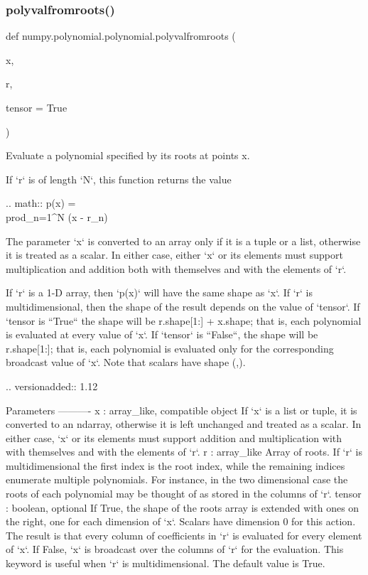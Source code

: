 \subsubsection{\texorpdfstring{polyvalfromroots()}{polyvalfromroots()}}
{\footnotesize\ttfamily def numpy.\+polynomial.\+polynomial.\+polyvalfromroots (\begin{DoxyParamCaption}\item[{}]{x,  }\item[{}]{r,  }\item[{}]{tensor = {\ttfamily True} }\end{DoxyParamCaption})}

\begin{DoxyVerb}Evaluate a polynomial specified by its roots at points x.

If `r` is of length `N`, this function returns the value

.. math:: p(x) = \\prod_{n=1}^{N} (x - r_n)

The parameter `x` is converted to an array only if it is a tuple or a
list, otherwise it is treated as a scalar. In either case, either `x`
or its elements must support multiplication and addition both with
themselves and with the elements of `r`.

If `r` is a 1-D array, then `p(x)` will have the same shape as `x`.  If `r`
is multidimensional, then the shape of the result depends on the value of
`tensor`. If `tensor is ``True`` the shape will be r.shape[1:] + x.shape;
that is, each polynomial is evaluated at every value of `x`. If `tensor` is
``False``, the shape will be r.shape[1:]; that is, each polynomial is
evaluated only for the corresponding broadcast value of `x`. Note that
scalars have shape (,).

.. versionadded:: 1.12

Parameters
----------
x : array_like, compatible object
    If `x` is a list or tuple, it is converted to an ndarray, otherwise
    it is left unchanged and treated as a scalar. In either case, `x`
    or its elements must support addition and multiplication with
    with themselves and with the elements of `r`.
r : array_like
    Array of roots. If `r` is multidimensional the first index is the
    root index, while the remaining indices enumerate multiple
    polynomials. For instance, in the two dimensional case the roots
    of each polynomial may be thought of as stored in the columns of `r`.
tensor : boolean, optional
    If True, the shape of the roots array is extended with ones on the
    right, one for each dimension of `x`. Scalars have dimension 0 for this
    action. The result is that every column of coefficients in `r` is
    evaluated for every element of `x`. If False, `x` is broadcast over the
    columns of `r` for the evaluation.  This keyword is useful when `r` is
    multidimensional. The default value is True.


\end{DoxyVerb}
